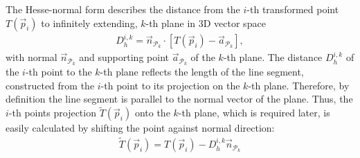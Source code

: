 The Hesse-normal form describes the distance from the $i$-th transformed point $T(\vec{p}_i)$ to infinitely extending, $k$-th plane in 3D vector space
\begin{align}\label{eq:hesse}
	D_{h}^{i,k} = \vec{n}_{\mathcal{P}_k} \cdot \left[ T(\vec{p}_i) - \vec{a}_{\mathcal{P}_k} \right] ,
\end{align}
with normal $\vec{n}_{\mathcal{P}_k}$ and supporting point $\vec{a}_{\mathcal{P}_k}$ of the $k$-th plane.
The distance $D_{h}^{i,k}$ of the $i$-th point to the $k$-th plane reflects the length of the line segment, constructed from the $i$-th point to its projection on the $k$-th plane.
Therefore, by definition the line segment is parallel to the normal vector of the plane.
Thus, the $i$-th points projection $\widetilde{T}(\vec{p}_i)$ onto the $k$-th plane, which is required later, is easily calculated by shifting the point against normal direction:
\begin{align}\label{eq:projection}
	\widetilde{T}(\vec{p}_i) = T(\vec{p}_i) - D_{h}^{i,k} \vec{n}_{\mathcal{P}_k}
\end{align}

